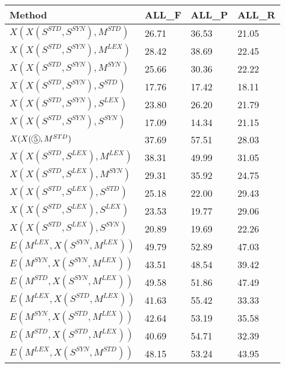 \begin{table*}[]
\centering
\begin{tabular}{@{\makebox[1.25em][l]{\rownumber\space}}llll@{}}
\toprule
% 
\textbf{Method} & \textbf{ALL\_F} & \textbf{ALL\_P} & \textbf{ALL\_R} \\ \midrule


$X(X(S^{STD}, S^{SYN}), M^{STD})$  & 26.71           & 36.53           & 21.05\\ 
$X(X(S^{STD}, S^{SYN}), M^{LEX})$  & 28.42          & 38.69           & 22.45\\ 
$X(X(S^{STD}, S^{SYN}), M^{SYN})$  & 25.66           & 30.36           & 22.22 \\ 
\midrule

$X(X(S^{STD}, S^{SYN}), S^{STD})$  & 17.76           & 17.42           & 18.11\\ 
$X(X(S^{STD}, S^{SYN}), S^{LEX})$  & 23.80          & 26.20           & 21.79\\ 
$X(X(S^{STD}, S^{SYN}), S^{SYN})$  & 17.09           & 14.34           & 21.15 \\ 
\midrule
$X(X(\circlednumber{5}, M^{STD})$  & 37.69           & 57.51           & 28.03\\ 
$X(X(S^{STD}, S^{LEX}), M^{LEX})$  & 38.31          & 49.99           & 31.05\\ 
$X(X(S^{STD}, S^{LEX}), M^{SYN})$  & 29.31           & 35.92           & 24.75 \\ 
\midrule
%
$X(X(S^{STD}, S^{LEX}), S^{STD})$  & 25.18          & 22.00           & 29.43\\ 
$X(X(S^{STD}, S^{LEX}), S^{LEX})$  & 23.53         & 19.77           & 29.06\\ 
$X(X(S^{STD}, S^{LEX}), S^{SYN})$  & 20.89           & 19.69           & 22.26 \\ 
\midrule
$E(M^{LEX}, X(S^{SYN}, M^{LEX}))$      & 49.79	&	52.89	&	47.03           \\
$E(M^{SYN}, X(S^{SYN}, M^{LEX}))$      & 43.51	&	48.54	&	39.42          \\ 
$E(M^{STD}, X(S^{SYN}, M^{LEX}))$      & 49.58	&	51.86	&	47.49           \\
\midrule
$E(M^{LEX}, X(S^{STD}, M^{LEX}))$      & 41.63	&	55.42	&	33.33           \\
$E(M^{SYN}, X(S^{STD}, M^{LEX}))$      & 42.64	&	53.19	&	35.58           \\ 
$E(M^{STD}, X(S^{STD}, M^{LEX}))$      & 40.69	&	54.71	&	32.39			\\
\midrule
$E(M^{LEX}, X(S^{SYN}, M^{STD}))$      & 48.15	&	53.24	&	43.95           \\

\end{tabular}
\end{table*}
